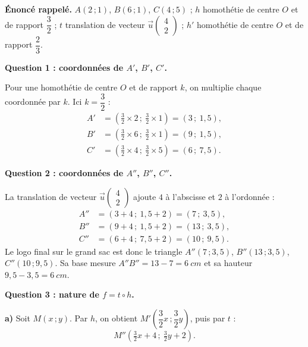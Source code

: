 \documentclass[11pt]{article}
\begin{document}
\begin{exoresolu}
\textbf{Énoncé rappelé.} $A(2\,;1)$, $B(6\,;1)$, $C(4\,;5)$ ; $h$ homothétie de centre $O$ et de rapport $\dfrac{3}{2}$ ; $t$ translation de vecteur $\vec{u}\begin{pmatrix} 4 \\ 2 \end{pmatrix}$ ; $h'$ homothétie de centre $O$ et de rapport $\dfrac{2}{3}$.

\tcblower

\textbf{Question 1 : coordonnées de $A'$, $B'$, $C'$.}

Pour une homothétie de centre $O$ et de rapport $k$, on multiplie chaque coordonnée par $k$. Ici $k=\dfrac{3}{2}$ :
\begin{align*}
A' &= \left(\tfrac{3}{2}\times 2\,;\ \tfrac{3}{2}\times 1\right) = (3\,;\ 1{,}5),\\
B' &= \left(\tfrac{3}{2}\times 6\,;\ \tfrac{3}{2}\times 1\right) = (9\,;\ 1{,}5),\\
C' &= \left(\tfrac{3}{2}\times 4\,;\ \tfrac{3}{2}\times 5\right) = (6\,;\ 7{,}5).
\end{align*}

\textbf{Question 2 : coordonnées de $A''$, $B''$, $C''$.}

La translation de vecteur $\vec{u}\begin{pmatrix} 4 \\ 2 \end{pmatrix}$ ajoute $4$ à l'abscisse et $2$ à l'ordonnée :
\begin{align*}
A'' &= (3+4\,;\ 1{,}5+2) = (7\,;\ 3{,}5),\\
B'' &= (9+4\,;\ 1{,}5+2) = (13\,;\ 3{,}5),\\
C'' &= (6+4\,;\ 7{,}5+2) = (10\,;\ 9{,}5).
\end{align*}
Le logo final sur le grand sac est donc le triangle $A''(7\,;3{,}5)$, $B''(13\,;3{,}5)$, $C''(10\,;9{,}5)$. Sa base mesure $A''B'' = 13-7 = \SI{6}{cm}$ et sa hauteur $9{,}5-3{,}5 = \SI{6}{cm}$.

\textbf{Question 3 : nature de $f = t \circ h$.}

\textbf{a)} Soit $M(x\,;y)$. Par $h$, on obtient $M'\left(\dfrac{3}{2}x\,;\dfrac{3}{2}y\right)$, puis par $t$ :
\[ M''\left(\tfrac{3}{2}x + 4\,;\ \tfrac{3}{2}y + 2\right). \]


\end{exoresolu}
\end{document}
